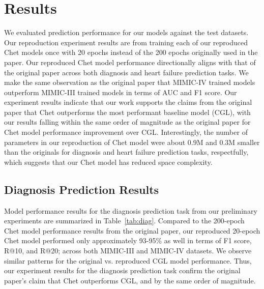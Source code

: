 \documentclass[11pt,a4paper,fleqn]{article}
\begin{document}
\section{Results}
We evaluated prediction performance for our models against the test datasets.
Our reproduction experiment results are from training each of our reproduced
Chet models once with 20 epochs instead of the 200 epochs originally used in the
paper. Our reproduced Chet model performance directionally aligns with that of
the original paper across both diagnosis and heart failure prediction tasks. We
make the same observation as the original paper that MIMIC-IV trained models
outperform MIMIC-III trained models in terms of AUC and F1 score. Our experiment
results indicate that our work supports the claims from the original paper that
Chet outperforms the most performant baseline model (CGL), with our results
falling within the same order of magnitude as the original paper for Chet model
performance improvement over CGL. Interestingly, the number of parameters in our
reproduction of Chet model were about 0.9M and 0.3M smaller than the originals
for diagnosis and heart failure prediction tasks, respectfully, which suggests
that our Chet model has reduced space complexity.

\subsection{Diagnosis Prediction Results}
Model performance results for the diagnosis prediction task from our preliminary
experiments are summarized in Table~\ref{tab:diag}. Compared to the 200-epoch
Chet model performance results from the original paper, our reproduced 20-epoch
Chet model performed only approximately 93-95\% as well in terms of F1 score,
R@10, and R@20; across both MIMIC-III and MIMIC-IV datasets. We observe similar
patterns for the original vs. reproduced CGL model performance. Thus, our
experiment results for the diagnosis prediction task confirm the original
paper's claim that Chet outperforms CGL, and by the same order of magnitude. 
\end{document}
